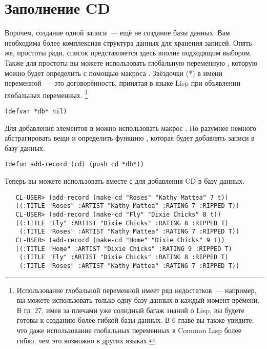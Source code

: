 \section{Заполнение CD}

Впрочем, создание одной записи~--- ещё не создание базы данных. Вам необходима более
комплексная структура данных для хранения записей. Опять же, простоты ради, список
представляется здесь вполне подходящим выбором. Также для простоты вы можете использовать
глобальную переменную , которую можно будет определить с помощью макроса
. Звёздочки (*) в имени переменной~--- это договорённость, принятая в языке
Lisp при объявлении глобальных переменных. \footnote{Использование глобальной переменной
  имеет ряд недостатков~--- например, вы можете использовать только одну базу данных в
  каждый момент времени. В гл. 27, имея за плечами уже солидный багаж знаний о Lisp, вы
  будете готовы к созданию более гибкой базы данных. В 6 главе вы также увидите, что даже
  использование глобальных переменных в Common Lisp более гибко, чем это возможно в других
  языках.}

\begin{lstlisting}
(defvar *db* nil)
\end{lstlisting}

Для добавления элементов в  можно использовать макрос . Но
разумнее немного абстрагировать вещи и определить функцию , которая будет
добавлять записи в базу данных.

\begin{lstlisting}
(defun add-record (cd) (push cd *db*))
\end{lstlisting}

Теперь вы можете использовать  вместе с  для добавления CD
в базу данных.

\begin{verbatim}
   CL-USER> (add-record (make-cd "Roses" "Kathy Mattea" 7 t))
   ((:TITLE "Roses" :ARTIST "Kathy Mattea" :RATING 7 :RIPPED T))
   CL-USER> (add-record (make-cd "Fly" "Dixie Chicks" 8 t))
   ((:TITLE "Fly" :ARTIST "Dixie Chicks" :RATING 8 :RIPPED T)
    (:TITLE "Roses" :ARTIST "Kathy Mattea" :RATING 7 :RIPPED T))
   CL-USER> (add-record (make-cd "Home" "Dixie Chicks" 9 t))
   ((:TITLE "Home" :ARTIST "Dixie Chicks" :RATING 9 :RIPPED T)
    (:TITLE "Fly" :ARTIST "Dixie Chicks" :RATING 8 :RIPPED T)
    (:TITLE "Roses" :ARTIST "Kathy Mattea" :RATING 7 :RIPPED T))
\end{verbatim}

